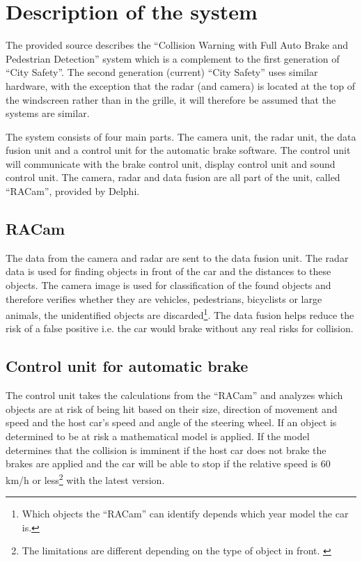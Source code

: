 \documentclass[conference]{IEEEtran}
\begin{document}

\section{Description of the system}
The provided source describes the ``Collision Warning with Full Auto Brake and Pedestrian Detection'' system which is a complement to the first generation of ``City Safety''. The second generation (current) ``City Safety'' uses similar hardware, with the exception that the radar (and camera) is located at the top of the windscreen rather than in the grille, it will therefore be assumed that the systems are similar. \cite{SysDescription,RACam,DelphiVolvo}

The system consists of four main parts. The camera unit, the radar unit, the data fusion unit and a control unit for the automatic brake software. The control unit will communicate with the brake control unit, display control unit and sound control unit. The camera, radar and data fusion are all part of the unit, called ``RACam'', provided by Delphi. \cite{SysDescription,DelphiVolvo}

\subsection{RACam}
The data from the camera and radar are sent to the data fusion unit. The radar data is used for finding objects in front of the car and the distances to these objects. The camera image is used for classification of the found objects and therefore verifies whether they are vehicles, pedestrians, bicyclists or large animals, the unidentified objects are discarded\footnote{Which objects the ``RACam'' can identify depends which year model the car is.}. The data fusion helps reduce the risk of a false positive i.e. the car would brake without any real risks for collision. \cite{SysDescription}

\subsection{Control unit for automatic brake}
The control unit takes the calculations from the ``RACam'' and analyzes which objects are at risk of being hit based on their size, direction of movement and speed and the host car's speed and angle of the steering wheel. If an object is determined to be at risk a mathematical model is applied. If the model determines that the collision is imminent if the host car does not brake the brakes are applied and the car will be able to stop if the relative speed is 60 km/h or less\footnote{The limitations are different depending on the type of object in front. \cite{CitySafetyDefinition}} with the latest version. \cite{SysDescription, CitySafetyDefinition}
\end{document}
